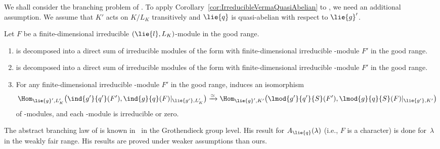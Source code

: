 We shall consider the branching problem of .
To apply Corollary~\ref{cor:IrreducibleVermaQuasiAbelian} to , we need an additional assumption.
We assume that $K'$ acts on $K/L_K$ transitively and $\lie{q}$ is quasi-abelian with respect to $\lie{g}'$.

\begin{Theorem}\label{thm:DerivedFunctorModuleQuasiAbelian}
	Let $F$ be a finite-dimensional irreducible $(\lie{l}, L_K)$-module in the good range.
	\begin{enumerate}\itemsep=0pt
		\item[$1.$]  is decomposed into a direct sum of irreducible modules of the form  with finite-dimensional irreducible -module $F'$ in the good range.
		\item[$2.$]  is decomposed into a direct sum of irreducible modules of the form  with finite-dimensional irreducible -module $F'$ in the good range.
		\item[$3.$] For any finite-dimensional irreducible -module $F'$ in the good range,  induces an isomorphism
		\begin{align*}
			\Hom_{\lie{g}', L'_K}\bigl(\ind{g'}{q'}(F'), \ind{g}{q}(F)|_{\lie{g'}, L'_K}\bigr) \xrightarrow{\simeq} \Hom_{\lie{g}', K'}\bigl(\lmod{g'}{q'}{S}(F'), \lmod{g}{q}{S}(F)|_{\lie{g'}, K'}\bigr)
		\end{align*}
		of -modules, and
		each -module  is ir\-re\-du\-cible or zero.
	\end{enumerate}
\end{Theorem}

\begin{Remark}
	The abstract branching law of  is known in~\cite[Corollaries 5.7 and 5.8]{Os24} in the Grothendieck group level.
	His result for $A_{\lie{q}}(\lambda)$ (i.e., $F$ is a character) is done for~$\lambda$ in the weakly fair range.
	His results are proved under weaker assumptions than ours.
\end{Remark}

